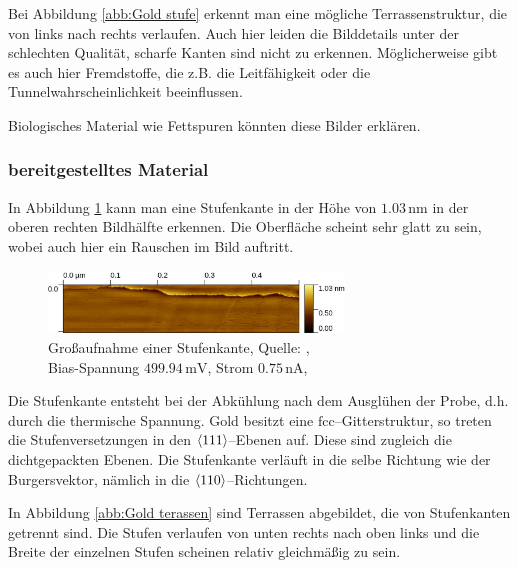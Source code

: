 \documentclass[12pt,a4paper]{scrartcl}
\numberwithin{equation}{section} %
\begin{document}
Bei Abbildung \ref{abb:Gold stufe} erkennt man eine mögliche Terrassenstruktur, die von links nach rechts verlaufen. Auch hier leiden die Bilddetails unter der schlechten Qualität, scharfe Kanten sind nicht zu erkennen. Möglicherweise gibt es auch hier Fremdstoffe, die z.B. die Leitfähigkeit oder die Tunnelwahrscheinlichkeit beeinflussen.

Biologisches Material wie Fettspuren könnten diese Bilder erklären.

\newpage
\hypertarget{bereitgestelltes-material}{%
\subsubsection{bereitgestelltes
Material}\label{bereitgestelltes-material}}

In Abbildung \ref{abb:Gold Stufenkante} kann man eine Stufenkante in der Höhe von $1.03\mathrm{\,nm}$ in der oberen rechten Bildhälfte erkennen. Die Oberfläche scheint sehr glatt zu sein, wobei auch hier ein Rauschen im Bild auftritt.

\begin{figure}[ht]
	\centering
	\includegraphics[width=0.7\textwidth]{../media/B2.5/Stufenkante.pdf}
	\caption{Großaufnahme einer Stufenkante, Quelle: \cite{Grover}, \\
			Bias-Spannung $499.94 \mathrm{\,mV}$, Strom $0.75 \mathrm{\,nA}$,}
	\label{abb:Gold Stufenkante}
\end{figure}

Die Stufenkante entsteht bei der Abkühlung nach dem Ausglühen der Probe, d.h. durch die thermische Spannung. Gold besitzt eine $\mathrm{fcc}$--Gitterstruktur, so treten die Stufenversetzungen in den $\expval{111}$--Ebenen auf. Diese sind zugleich die dichtgepackten Ebenen. Die Stufenkante verläuft in die selbe Richtung wie der Burgersvektor, nämlich in die $\expval{110}$--Richtungen.

In Abbildung \ref{abb:Gold terassen} sind Terrassen abgebildet, die von Stufenkanten getrennt sind. Die Stufen verlaufen von unten rechts nach oben links und die Breite der einzelnen Stufen scheinen relativ gleichmäßig zu sein.
\end{document}
